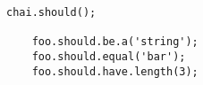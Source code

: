 
\begin{lstlisting}[basicstyle=\basicstyle]
	chai.should();

	foo.should.be.a('string');
	foo.should.equal('bar');
	foo.should.have.length(3);
\end{lstlisting}
